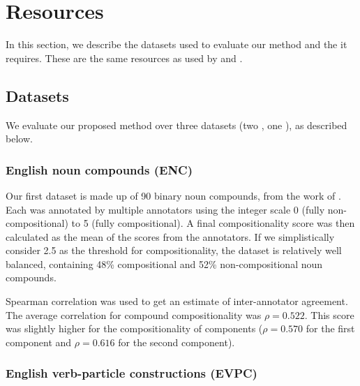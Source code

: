 \documentclass[output=paper
,modfonts
,nonflat]{langsci/langscibook}
\begin{document}
\section{Resources}

In this section, we describe the datasets used to evaluate our method
and the  it requires. These are the same
resources as used by \cite{salehi2013} and
\cite{DBLP:conf/eacl/SalehiCB14}.

\subsection{Datasets}
\label{salehi:sec:dataset}

We evaluate our proposed method over three datasets (two , one
), as described below.

\subsubsection{English noun compounds (ENC)}
\label{sec:enc}

Our first dataset is made up of 90 binary  noun compounds, from
the work of \citet{reddy2011a}. Each  was annotated by
multiple annotators using the integer scale 0 (fully
non-compositional) to 5 (fully compositional). A final
compositionality score was then calculated as the mean of the scores
from the annotators. If we simplistically consider 2.5 as the
threshold for compositionality, the dataset is relatively well
balanced, containing 48\% compositional and 52\% non-compositional
noun compounds. 

Spearman correlation was used to get an estimate of inter-annotator
agreement.  The average correlation for compound compositionality was
$\rho = 0.522$. This score was slightly higher for the compositionality of
components ($\rho = 0.570$ for the first component and $\rho = 0.616$ for the second
component).




\subsubsection{English verb-particle constructions (EVPC)}
\label{sec:evpc}
\end{document}
